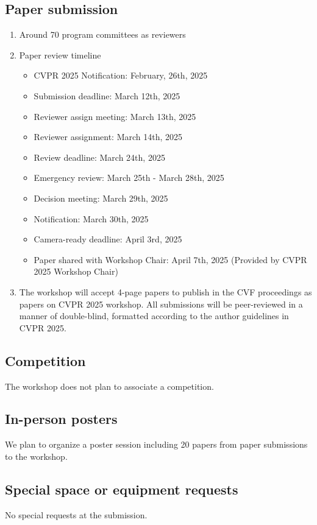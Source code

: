 \documentclass{article}
\begin{document}
\subsection{Paper submission}
\begin{enumerate}[label=(\alph*)]
    \item Around 70 program committees as reviewers
    \item Paper review timeline
    \begin{itemize}
        \item CVPR 2025 Notification: February, 26th, 2025
        \item Submission deadline: March 12th, 2025
        \item Reviewer assign meeting: March 13th, 2025
        \item Reviewer assignment: March 14th, 2025
        \item Review deadline: March 24th, 2025
        \item Emergency review: March 25th - March 28th, 2025
        \item Decision meeting: March 29th, 2025
        \item Notification: March 30th, 2025
        \item Camera-ready deadline: April 3rd, 2025
        \item Paper shared with Workshop Chair: April 7th, 2025 (Provided by CVPR 2025 Workshop Chair)
    \end{itemize}
    \item The workshop will accept 4-page papers to publish in the CVF proceedings as papers on CVPR 2025 workshop. All submissions will be peer-reviewed in a manner of double-blind, formatted according to the author guidelines in CVPR 2025.
\end{enumerate}

\subsection{Competition}
The workshop does not plan to associate a competition.

\subsection{In-person posters}
We plan to organize a poster session including 20 papers from paper submissions to the workshop.

\subsection{Special space or equipment requests}
No special requests at the submission.
\end{document}
